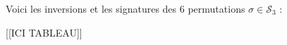 \documentclass[class=report,crop=false]{standalone}
\begin{document}
\begin{exemple}
Voici les inversions et les signatures des $6$ permutations $\sigma \in \mathcal{S}_3$ :

[[ICI TABLEAU]]

%
\end{exemple}
\end{document}
